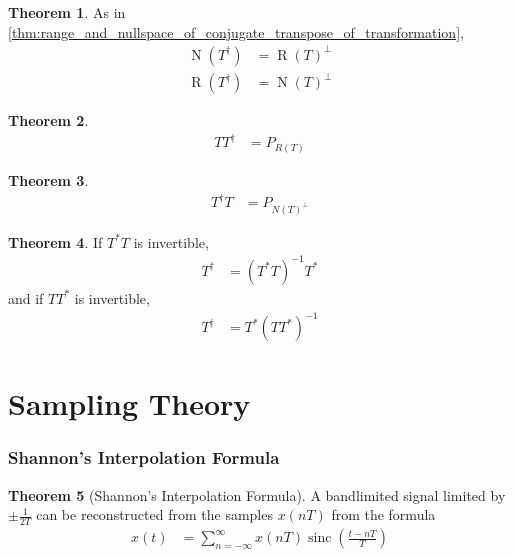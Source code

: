 \documentclass[titlepage, fleqn, a4paper, 12pt, twoside]{article}
\theoremstyle{definition}
\theoremstyle{theorem}
\newtheorem{theorem}{Theorem}
\DeclareMathOperator{\sinc}{\mathrm{sinc}}
\DeclareMathOperator{\nullspace}{\mathrm{N}}
\DeclareMathOperator{\range}{\mathrm{R}}
\begin{document}
\begin{theorem}
	As in \cref{thm:range_and_nullspace_of_conjugate_transpose_of_transformation},
	\begin{align*}
		\nullspace\left( T^{\dagger} \right) &= \range(T)^{\perp}\\
		\range\left( T^{\dagger} \right) &= \nullspace(T)^{\perp}
	\end{align*}
	\label{thm:range_and_nullspace_of_pseudoinverse_of_transformation}
\end{theorem}

\begin{theorem}
	\begin{align*}
		T T^{\dagger} &= P_{R(T)}
	\end{align*}
\end{theorem}

\begin{theorem}
	\begin{align*}
		T^{\dagger} T &= P_{{N(T)}^{\perp}}
	\end{align*}
\end{theorem}

\begin{theorem}
	If $T^* T$ is invertible,
	\begin{align*}
		T^{\dagger} &= \left( T^* T \right)^{-1} T^*
	\end{align*}
	and if $T T^*$ is invertible,
	\begin{align*}
		T^{\dagger} &= T^* \left( T T^* \right)^{-1}
	\end{align*}
\end{theorem}

\clearpage
\part{Sampling Theory}

\section{Shannon's Interpolation Formula}

\begin{theorem}[Shannon's Interpolation Formula]
	A bandlimited signal limited by $\pm\frac{1}{2 T}$ can be reconstructed from the samples $x(n T)$ from the formula
	\begin{align*}
		x(t) &= \sum\limits_{n = -\infty}^{\infty} x(n T) \sinc\left( \frac{t - n T}{T} \right)
	\end{align*}
	\label{thm:Shannons_Interpolation_Formula}
\end{theorem}
\end{document}
